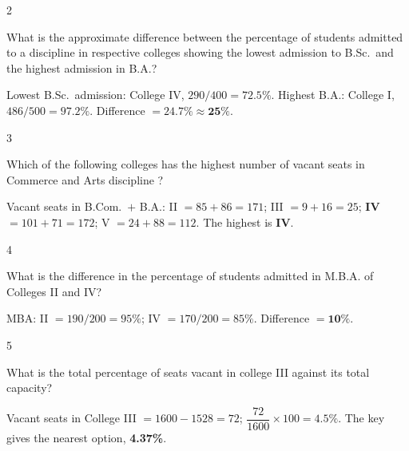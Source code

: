 \begin{question}{2}
{What is the approximate difference between the percentage of students admitted to a discipline in respective colleges showing the lowest admission to B.Sc.\ and the highest admission in B.A.?\par}
\begin{explain}
Lowest B.Sc.\ admission: College IV, $290/400=72.5\%$. Highest B.A.: College I, $486/500=97.2\%$. Difference $=24.7\%\approx\mathbf{25\%}$.
\end{explain}
\end{question}

\begin{question}{3}
{Which of the following colleges has the highest number of vacant seats in Commerce and Arts discipline ?\par}
\begin{explain}
Vacant seats in B.Com.\ $+$ B.A.: II $=85+86=171$; III $=9+16=25$; \textbf{IV $=101+71=172$}; V $=24+88=112$. The highest is \textbf{IV}.
\end{explain}
\end{question}

\begin{question}{4}
{What is the difference in the percentage of students admitted in M.B.A. of Colleges II and IV?\par}
\begin{explain}
MBA: II $=190/200=95\%$; IV $=170/200=85\%$. Difference $=\mathbf{10\%}$.
\end{explain}
\end{question}

\begin{question}{5}
{What is the total percentage of seats vacant in college III against its total capacity?\par}
\begin{explain}
Vacant seats in College III $=1600-1528=72$; $\dfrac{72}{1600}\times100=4.5\%$. The key gives the nearest option, \textbf{4.37\%}.
\end{explain}
\end{question}

